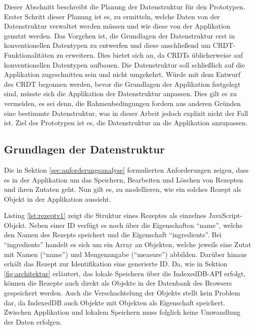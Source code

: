 \documentclass[a4paper, 12pt]{scrreprt}
\begin{document}
Dieser Abschnitt beschreibt die Planung der Datenstruktur für den Prototypen. Erster Schritt dieser Planung ist es, zu ermitteln, welche Daten von der Datenstruktur verwaltet werden müssen und wie diese von der Applikation genutzt werden. Das Vorgehen ist, die Grundlagen der Datenstruktur erst in konventionellen Datentypen zu entwerfen und diese anschließend um CRDT-Funktionalitäten zu erweitern. Dies bietet sich an, da \acp{CRDT} üblicherweise auf konventionellen Datentypen aufbauen. Die Datenstruktur soll schließlich auf die Applikation zugeschnitten sein und nicht umgekehrt. Würde mit dem Entwurf des CRDT begonnen werden, bevor die Grundlagen der Applikation festgelegt sind, müsste sich die Applikation der Datenstruktur anpassen. Dies gilt es zu vermeiden, es sei denn, die Rahmenbedingungen fordern aus anderen Gründen eine bestimmte Datenstruktur, was in dieser Arbeit jedoch explizit nicht der Fall ist. Ziel des Prototypen ist es, die Datenstruktur an die Applikation anzupassen. 

\subsection{Grundlagen der Datenstruktur}

Die in Sektion \ref{sec:anforderungsanalyse} formulierten Anforderungen zeigen, dass es in der Applikation um das Speichern, Bearbeiten und Löschen von Rezepten und ihren Zutaten geht. Nun gilt es, zu modellieren, wie ein solches Rezept als Objekt in der Applikation aussieht. 

Listing \ref{lst:rezeptv1} zeigt die Struktur eines Rezeptes als einzelnes JavaScript-Objekt. Neben einer ID verfügt es noch über die Eigenschaften \enquote{name}, welche den Namen des Rezepts speichert und die Eigenschaft \enquote{ingredients}. Bei \enquote{ingredients} handelt es sich um ein Array an Objekten, welche jeweils eine Zutat mit Namen (\enquote{name}) und Mengenangabe (\enquote{measure}) abbilden. Darüber hinaus erhält das Rezept zur Identifikation eine generierte ID. Da, wie in Sektion \ref{fig:architektur} erläutert, das lokale Speichern über die IndexedDB-API erfolgt, können die Rezepte auch direkt als Objekte in der Datenbank des Browsers gespeichert werden. Auch die Verschachtelung der Objekte stellt kein Problem dar, da IndexedDB auch Objekte mit Objekten als Eigenschaft speichert. Zwischen Applikation und lokalem Speichern muss folglich keine Umwandlung der Daten erfolgen.

\end{document}
